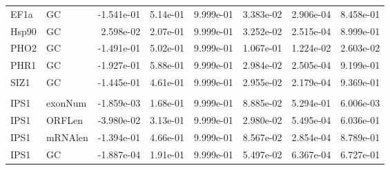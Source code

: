 \documentclass{standalone}
\begin{document}
\begin{tabular}{llrrrrrr}
EF1a & GC & -1.541e-01 & 5.14e-01 & 9.999e-01 & 3.383e-02 & 2.906e-04 & 8.458e-01 \\ 
Hsp90 & GC &  2.598e-02 & 2.07e-01 & 9.999e-01 & 3.252e-02 & 2.515e-04 & 8.999e-01 \\ 
PHO2 & GC & -1.491e-01 & 5.02e-01 & 9.999e-01 & 1.067e-01 & 1.224e-02 & 2.603e-02 \\ 
PHR1 & GC & -1.927e-01 & 5.88e-01 & 9.999e-01 & 2.984e-02 & 2.505e-04 & 9.199e-01 \\ 
SIZ1 & GC & -1.445e-01 & 4.61e-01 & 9.999e-01 & 2.955e-02 & 2.179e-04 & 9.369e-01 \\ 
\\
IPS1 & exonNum & -1.859e-03 & 1.68e-01 & 9.999e-01 & 8.885e-02 & 5.294e-01 & 6.006e-03 \\ 
IPS1 & ORFLen & -3.980e-02 & 3.13e-01 & 9.999e-01 & 2.980e-02 & 5.495e-04 & 6.036e-01 \\ 
IPS1 & mRNAlen & -1.394e-01 & 4.66e-01 & 9.999e-01 & 8.567e-02 & 2.854e-04 & 8.789e-01 \\ 
IPS1 & GC & -1.887e-04 & 1.91e-01 & 9.999e-01 & 5.497e-02 & 6.367e-04 & 6.727e-01 \\ 
\bottomrule
\end{tabular}
\end{document}
